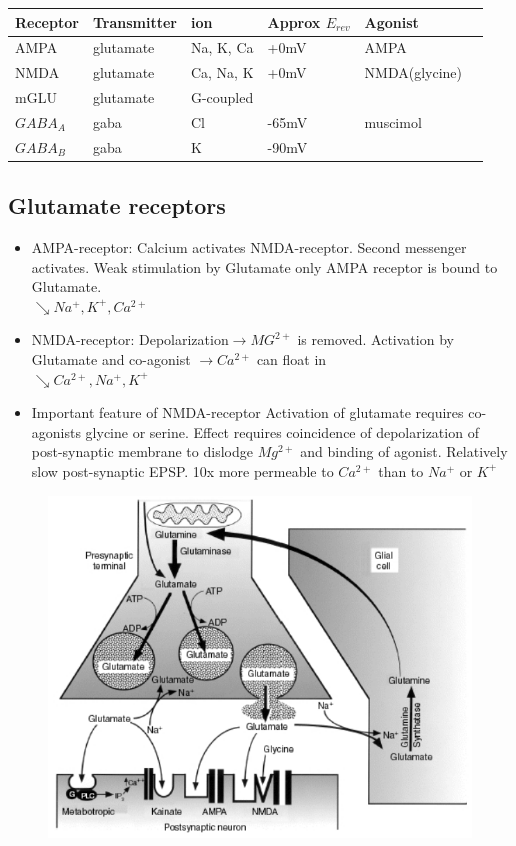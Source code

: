 \documentclass[english,11pt]{article}
\begin{document}
\begin{tabular}{|l|l|l|l|l|l|}
\hline
Receptor & Transmitter & ion & Approx $E_{rev}$ & Agonist\\
\hline
AMPA & glutamate & Na, K, Ca & +0mV & AMPA \\
\hline
	NMDA & glutamate & Ca, Na, K & +0mV & NMDA(glycine) \\
\hline
	mGLU & glutamate & G-coupled & & \\
\hline
	 $GABA_A$ & gaba & Cl & -65mV & muscimol \\
\hline
	 $GABA_B$ & gaba & K & -90mV &  \\
\hline
\end{tabular}

\subsection{Glutamate receptors}


\begin{itemize}
\item AMPA-receptor: Calcium activates NMDA-receptor. Second messenger activates. Weak stimulation by Glutamate only AMPA receptor is bound to Glutamate.\\
$\searrow Na^+,K^+,Ca^{2+}$
\item NMDA-receptor: Depolarization$\rightarrow MG^{2+}$ is removed. Activation by Glutamate and co-agonist $\to Ca^{2+}$ can float in\\
$\searrow Ca^{2+},Na^+,K^+$
\item Important feature of NMDA-receptor
\subitem Activation of glutamate requires co-agonists glycine or serine.
\subitem Effect requires coincidence of depolarization of post-synaptic membrane to dislodge $Mg^{2+}$ and binding of agonist.
\subitem Relatively slow post-synaptic EPSP.
\subitem 10x more permeable to $Ca^{2+}$ than to $Na^+$ or $K^+$
\end{itemize}
\begin{figure}[htbp]
\centering
  \includegraphics[scale=0.4]{glutamate-neuron.png}
\end{figure} 
\end{document}
